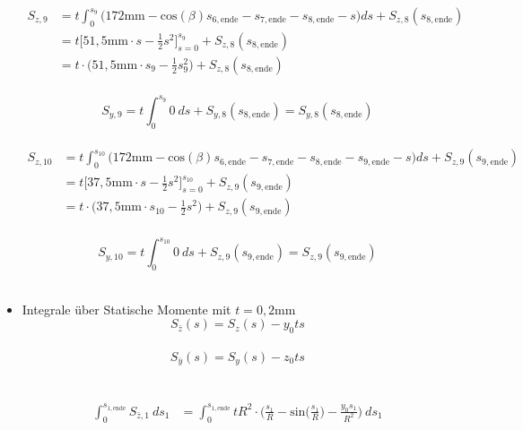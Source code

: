 \begin{itemize}
\begin{equation}
		\begin{split}
		S_{z,9} &= t\int_{0}^{s_9}\bigg(172\mathrm{mm}-\mathrm{cos}(\beta)s_{6,\mathrm{ende}}-s_{7,\mathrm{ende}}-s_{8,\mathrm{ende}}-s\bigg)ds + S_{z,8}(s_{8,\mathrm{ende}})\\\
		&= t\bigg[51,5\mathrm{mm}\cdot s-\frac{1}{2}s^2\bigg]_{s=0}^{s_9} + S_{z,8}(s_{8,\mathrm{ende}})\\\
		&= t\cdot\bigg(51,5\mathrm{mm}\cdot s_9-\frac{1}{2}s^2_9\bigg) + S_{z,8}(s_{8,\mathrm{ende}})
	\end{split}
\end{equation}\\
\begin{equation}
	S_{y,9} = t\int_{0}^{s_9}0\ ds + S_{y,8}(s_{8,\mathrm{ende}}) = S_{y,8}(s_{8,\mathrm{ende}})
\end{equation}\\
\begin{equation}
	\begin{split}
		S_{z,10} &= t\int_{0}^{s_{10}}\bigg(172\mathrm{mm}-\mathrm{cos}(\beta)s_{6,\mathrm{ende}}-s_{7,\mathrm{ende}}-s_{8,\mathrm{ende}}-s_{9,\mathrm{ende}}-s\bigg)ds + S_{z,9}(s_{9,\mathrm{ende}})\\\
		&= t\bigg[37,5\mathrm{mm}\cdot s - \frac{1}{2}s^2\bigg]_{s=0}^{s_{10}} + S_{z,9}(s_{9,\mathrm{ende}})\\\
		&= t\cdot\bigg(37,5\mathrm{mm}\cdot s_{10} - \frac{1}{2}s^2\bigg) + S_{z,9}(s_{9,\mathrm{ende}})
	\end{split}
\end{equation}\\
\begin{equation}
	S_{y,10} = t\int_{0}^{s_{10}}0\ ds + S_{z,9}(s_{9,\mathrm{ende}}) = S_{z,9}(s_{9,\mathrm{ende}})
\end{equation}\\
	\item Integrale über Statische Momente mit $t=0,2$mm
	\begin{equation}
		S_{\bar z}(s) = S_z(s) - y_0ts
	\end{equation}\\
	\begin{equation}
		S_{\bar y}(s) = S_y(s) - z_0ts
	\end{equation}\\
~\\%
	\begin{equation}
		\begin{split}
			\int_{0}^{s_{1,\mathrm{ende}}} S_{\bar z,1}\ ds_1 &= \int_{0}^{s_{1,\mathrm{ende}}}  tR^2\cdot\bigg(\frac{s_1}{R}-\mathrm{sin}\bigg(\frac{s_1}{R}\bigg)-\frac{y_0s_1}{R^2}\bigg)\ ds_1\\\

\end{split}
\end{equation}
\end{itemize}
